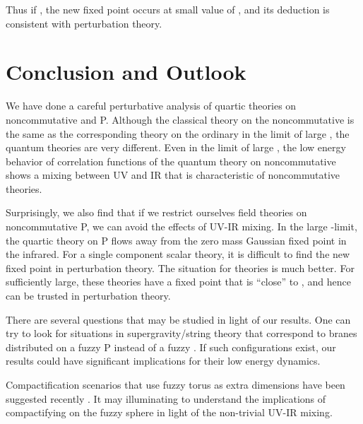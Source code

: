 \documentclass[a4paper,12pt]{article}
\numberwithin{equation}{section}
\begin{document}
Thus if
\coordHE{}, the new fixed point occurs at small value of \coordHE{},
and its deduction is consistent with perturbation theory.

\section{Conclusion and Outlook}

We have done a careful perturbative analysis of quartic theories on
noncommutative \coordHE{} and \coordHE{}P\coordHE{}. Although the classical
theory on the noncommutative \coordHE{} is the same as the corresponding
theory on the ordinary \coordHE{} in the limit of large \coordHE{}, the quantum
theories are very different. Even in the limit of large \coordHE{}, the low
energy behavior of correlation functions of the quantum theory on
noncommutative \coordHE{} shows a mixing between UV and IR that is
characteristic of noncommutative theories.

Surprisingly, we also find that if we restrict ourselves field
theories on noncommutative \coordHE{}P\coordHE{}, we can avoid the
effects of UV-IR mixing. In the large \coordHE{}-limit, the quartic theory on
\coordHE{}P\coordHE{} flows away from the zero mass Gaussian fixed point
in the infrared. For a single component scalar theory, it is difficult
to find the new fixed point in perturbation theory. The situation for
\coordHE{} theories is much better. For \coordHE{} sufficiently large, these
theories have a fixed point that is ``close'' to \coordHE{}, and
hence can be trusted in perturbation theory.

There are several questions that may be studied in light of our
results. One can try to look for situations in supergravity/string
theory that correspond to branes distributed on a fuzzy \coordHE{}P\coordHE{} instead of a fuzzy \coordHE{}. If such configurations exist, our
results could have significant implications for their low energy
dynamics.

Compactification scenarios that use fuzzy torus as extra dimensions
have been suggested recently \cite{gomewi}. It may illuminating to
understand the implications of compactifying on the fuzzy sphere in
light of the non-trivial UV-IR mixing.
\end{document}
